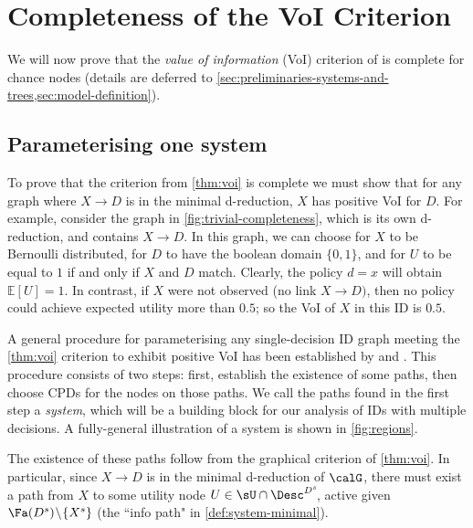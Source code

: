 \section{Completeness of the VoI Criterion} \label{sec:voi-completeness-main} %
We will now prove that the 
\emph{value of information} (VoI)
criterion 
of \citet{nilsson2000evaluating}
is complete for chance nodes
(details are deferred to \cref{sec:preliminaries-systems-and-trees,sec:model-definition}).


\subsection{Parameterising one system} \label{sec:tree} %
To prove 
that the criterion from \cref{thm:voi} is complete
we must show that for any graph where $X\to D$ is in the minimal d-reduction, 
$X$ has positive VoI for $D$.
For example, consider the graph in \cref{fig:trivial-completeness}, 
which is its own d-reduction, and contains $X \to D$.
In this graph, we can choose for $X$ to be Bernoulli distributed, 
for $D$ to have the boolean domain $\{0,1\}$, and for 
$U$ to be equal to $1$ if and only if $X$ and $D$ match.
Clearly, the policy $d=x$ will obtain $\mathbb{E}[U]=1$.
In contrast, 
if $X$ were not observed (no link $X\to D)$, then no policy could achieve expected utility more than $0.5$;
so the VoI of $X$ in this ID is $0.5$.~



A general procedure for parameterising any single-decision ID graph meeting the \cref{thm:voi} criterion to exhibit positive VoI has been established by \citet{Everitt2021agent} and \citet{lee2020characterizing}.
This procedure consists of two steps:
first, establish the existence of some paths, 
then choose CPDs for the nodes on those paths.
We call the paths found in the first step a \textit{system}, which will be a building block for our analysis of IDs with multiple decisions.
A fully-general illustration of a system is shown in \cref{fig:regions}.~




The existence of these paths follow from the graphical criterion of \cref{thm:voi}.
In particular, since $X \!\to\! D$ is in the minimal d-reduction of $\calG$, 
there must exist a path
from $X$ to some utility node $U \in \sU \cap \Desc^{D^s}\!$, active given $\Fa(D^s) \!\setminus\! \{X^s\}$ (the ``info path" in \cref{def:system-minimal}).




